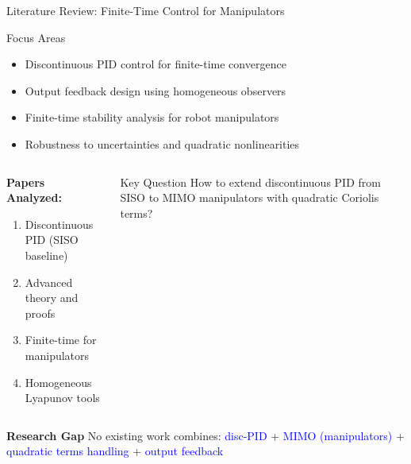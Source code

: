 \begin{frame}
  \sectionpage
\end{frame}

\begin{frame}{Literature Review: Finite-Time Control for Manipulators}
\footnotesize
 \begin{block}{Focus Areas}
   \begin{itemize}
     \item Discontinuous PID control for finite-time convergence
     \item Output feedback design using homogeneous observers
     \item Finite-time stability analysis for robot manipulators
     \item Robustness to uncertainties and quadratic nonlinearities
   \end{itemize}
 \end{block}
 
 \vspace{0.3cm}
 
 \begin{columns}
   \begin{column}{0.6\textwidth}
     \textbf{Papers Analyzed:}
     \begin{enumerate}
       \item \textbf{\cite{Mor20}} Discontinuous PID (SISO baseline)
       \item \textbf{\cite{MerMor20}} Advanced theory and proofs
       \item \textbf{\cite{CruNun21}} Finite-time for manipulators
       \item \textbf{\cite{CruMor17}} Homogeneous Lyapunov tools
     \end{enumerate}
   \end{column}
   
   \begin{column}{0.4\textwidth}
     \begin{alertblock}{Key Question}
       How to extend discontinuous PID from SISO to MIMO manipulators with quadratic Coriolis terms?
     \end{alertblock}
   \end{column}
 \end{columns}
 
 \vspace{0.2cm}
 
 \textbf{Research Gap}
   No existing work combines: \textcolor{blue}{disc-PID} + \textcolor{blue}{MIMO (manipulators)} + \textcolor{blue}{quadratic terms handling} + \textcolor{blue}{output feedback}
\end{frame}

